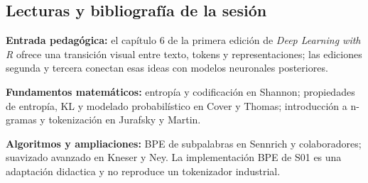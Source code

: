




\subsection{Lecturas y bibliografía de la sesión}
\textbf{Entrada pedagógica:} el capítulo 6 de la primera edición de
\emph{Deep Learning with R} ofrece una transición visual entre texto,
tokens y representaciones; las ediciones segunda y tercera conectan esas
ideas con modelos neuronales posteriores.

\textbf{Fundamentos matemáticos:} entropía y codificación en Shannon;
propiedades de entropía, KL y modelado probabilístico en Cover y Thomas;
introducción a n-gramas y tokenización en Jurafsky y Martin.

\textbf{Algoritmos y ampliaciones:} BPE de subpalabras en Sennrich y
colaboradores; suavizado avanzado en Kneser y Ney. La implementación BPE
de S01 es una adaptación didactica y no reproduce un tokenizador industrial.



